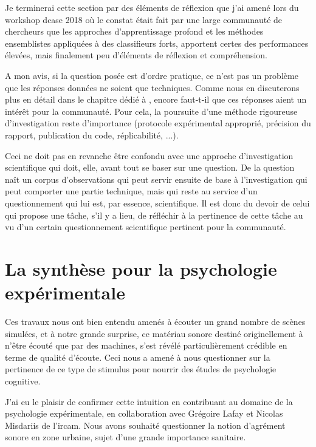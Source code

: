 Je terminerai cette section par des éléments de réflexion que j'ai amené lors du workshop dcase 2018 où le constat était fait par une large communauté de chercheurs que les approches d'apprentissage profond et les méthodes ensemblistes appliquées à des classifieurs forts, apportent certes des performances élevées, mais finalement peu d'éléments de réflexion et compréhension.

A mon avis, si la question posée est d'ordre pratique, ce n'est pas un problème que les réponses données ne soient que techniques. Comme nous en discuterons plus en détail dans le chapitre dédié à , encore faut-t-il que ces réponses aient un intérêt pour la communauté. Pour cela, la poursuite d'une méthode rigoureuse d'investigation reste d'importance (protocole expérimental approprié, précision du rapport, publication du code, réplicabilité, ...).

Ceci ne doit pas en revanche être confondu avec une approche d'investigation scientifique qui doit, elle, avant tout se baser sur une question. De la question naît un corpus d'observations qui peut servir ensuite de base à l'investigation qui peut comporter une partie technique, mais qui reste au service d'un questionnement qui lui est, par essence, scientifique. Il est donc du devoir de celui qui propose une tâche, s'il y a lieu, de réfléchir à la pertinence de cette tâche au vu d'un certain questionnement scientifique pertinent pour la communauté.

\section{ \nmu La  synthèse pour la psychologie expérimentale} \label{sec:psycho}

Ces travaux nous ont bien entendu amenés à écouter un grand nombre de scènes simulées, et à notre grande surprise, ce matériau sonore destiné originellement à n'être écouté que par des machines, s'est révélé particulièrement crédible en terme de qualité d'écoute. Ceci nous a amené à nous questionner sur la pertinence de ce type de stimulus pour nourrir des études de psychologie cognitive.

J'ai eu le plaisir de confirmer cette intuition en contribuant au domaine de la psychologie expérimentale, en collaboration avec Grégoire Lafay et Nicolas Misdariis de l'ircam. Nous avons souhaité questionner la notion d'agrément sonore en zone urbaine, sujet d'une grande importance sanitaire.

